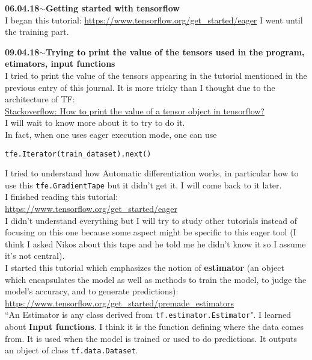\documentclass[11pt,a4paper]{article}
\newenvironment{loggentry}[2]%
{\noindent\textbf{#1}\hspace{1cm}$\mathbf{\sim}$\text{ }\textbf{#2}\\}{\vspace{0.5cm}}
\begin{document}
\begin{loggentry}{06.04.18}{Getting started with tensorflow}
I began this tutorial:
\url{https://www.tensorflow.org/get_started/eager}
I went until the training part.
\end{loggentry}

\begin{loggentry}{09.04.18}{Trying to print the value of the tensors used in the program, etimators, input functions}
I tried to print the value of the tensors appearing in the tutorial mentioned in the previous entry of this journal. It is more tricky than I thought due to the architecture of TF:\\
\href{https://stackoverflow.com/questions/33633370/how-to-print-the-value-of-a-tensor-object-in-tensorflow#33633839}{Stackoverflow: How to print the value of a tensor object in tensorflow?}\\
I will wait to know more about it to try to do it.\\
In fact, when one uses eager execution mode, one can use
\begin{verbatim}
tfe.Iterator(train_dataset).next()
\end{verbatim}
I tried to understand how Automatic differentiation works, in particular how to use this \texttt{tfe.GradientTape} but it didn't  get it. I will come back to it later.\\
I finished reading this tutorial:\\
\url{https://www.tensorflow.org/get_started/eager}\\
I didn't understand everything but I will try to study other tutorials instead of focusing on this one because some aspect might be specific to this eager tool (I think I asked Nikos about this tape and he told me he didn't know it so I assume it's not central).\\
I started this tutorial which emphasizes the notion of \textbf{estimator} (an object which encapsulates the model as well as methods to train the model, to judge the model's accuracy, and to generate predictions):\\
\url{https://www.tensorflow.org/get_started/premade_estimators}\\
``An Estimator is any class derived from \texttt{tf.estimator.Estimator}". I learned about \textbf{Input functions}. I think it is the function defining where the data comes from. It is used when the model is trained or used to do predictions. It outputs an object of class \texttt{tf.data.Dataset}.\\

\end{loggentry}
\end{document}

